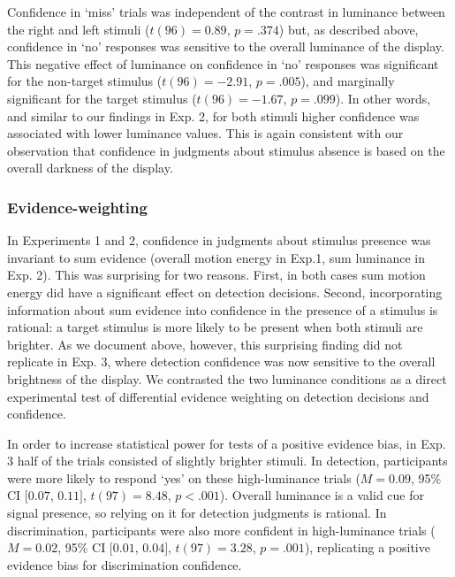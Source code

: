 \documentclass[12pt,twoside]{reedthesis}
\begin{document}
Confidence in `miss' trials was independent of the contrast in luminance between the right and left stimuli (\(t(96) = 0.89\), \(p = .374\)) but, as described above, confidence in `no' responses was sensitive to the overall luminance of the display. This negative effect of luminance on confidence in `no' responses was significant for the non-target stimulus (\(t(96) = -2.91\), \(p = .005\)), and marginally significant for the target stimulus (\(t(96) = -1.67\), \(p = .099\)). In other words, and similar to our findings in Exp. 2, for both stimuli higher confidence was associated with lower luminance values. This is again consistent with our observation that confidence in judgments about stimulus absence is based on the overall darkness of the display.

\hypertarget{evidence-weighting}{%
\subsubsection{Evidence-weighting}\label{evidence-weighting}}

In Experiments 1 and 2, confidence in judgments about stimulus presence was invariant to sum evidence (overall motion energy in Exp.1, sum luminance in Exp. 2). This was surprising for two reasons. First, in both cases sum motion energy did have a significant effect on detection decisions. Second, incorporating information about sum evidence into confidence in the presence of a stimulus is rational: a target stimulus is more likely to be present when both stimuli are brighter. As we document above, however, this surprising finding did not replicate in Exp. 3, where detection confidence was now sensitive to the overall brightness of the display. We contrasted the two luminance conditions as a direct experimental test of differential evidence weighting on detection decisions and confidence.

In order to increase statistical power for tests of a positive evidence bias, in Exp. 3 half of the trials consisted of slightly brighter stimuli. In detection, participants were more likely to respond `yes' on these high-luminance trials (\(M = 0.09\), 95\% CI \([0.07\), \(0.11]\), \(t(97) = 8.48\), \(p < .001\)). Overall luminance is a valid cue for signal presence, so relying on it for detection judgments is rational. In discrimination, participants were also more confident in high-luminance trials (\(M = 0.02\), 95\% CI \([0.01\), \(0.04]\), \(t(97) = 3.28\), \(p = .001\)), replicating a positive evidence bias for discrimination confidence.
\end{document}
